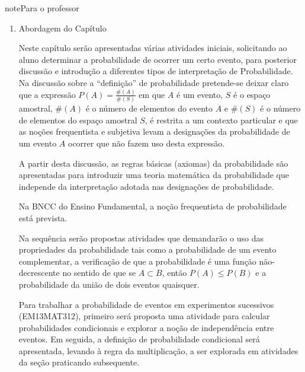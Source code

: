 \begin{sphinxadmonition}{note}{Para o professor}
\begin{enumerate}
(EM13MAT106) Identificar situações da vida cotidiana nas quais seja necessário fazer escolhas levando-se em conta os riscos probabilísticos (usar este ou aquele método contraceptivo, optar por um tratamento médico em detrimento de outro etc.)

(EM13MAT203) Aplicar conceitos matemáticos no planejamento, na execução e na análise de ações envolvendo a utilização de aplicativos e a criação de planilhas (para o controle de orçamento familiar, simuladores de cálculos de juros simples e compostos, entre outros), para tomar decisões.

\item {} 
Abordagem do Capítulo

Neste capítulo serão apresentadas várias atividades iniciais, solicitando ao aluno determinar a probabilidade de ocorrer um certo evento, para posterior discussão e introdução a diferentes tipos de interpretação de Probabilidade. Na discussão sobre a “definição” de probabilidade pretende-se deixar claro que a expressão \(P(A)=\displaystyle{\frac{\#(A)}{\#(S)}}\)  em que \(A\) é um evento, \(S\) é o espaço amostral, \(\#(A)\) é o número de elementos do evento \(A\) e \(\#(S)\) é o número de elementos do espaço amostral \(S\), é restrita a um contexto particular e que as noções frequentista e subjetiva levam a designações da probabilidade de um evento \(A\) ocorrer que não fazem uso desta expressão.

A partir desta discussão, as regras básicas (axiomas) da probabilidade são apresentadas para introduzir uma teoria matemática da probabilidade que independe da interpretação adotada nas designações de probabilidade.

Na BNCC do Ensino Fundamental, a noção frequentista de probabilidade está prevista.

Na sequência serão propostas atividades que demandarão o uso das propriedades da probabilidade tais como a probabilidade de um evento complementar, a verificação de que a probabilidade é uma função não-decrescente no sentido de que se \(A \subset B\), então \(P(A)\leq P(B)\) e a probabilidade da união de dois eventos quaisquer.

Para trabalhar a probabilidade de eventos em experimentos sucessivos (EM13MAT312), primeiro será proposta uma atividade para calcular probabilidades condicionais e explorar a noção de independência entre eventos. Em seguida, a definição de probabilidade condicional será apresentada, levando à regra da multiplicação, a ser explorada em atividades da seção praticando subsequente.


\end{enumerate}
\end{sphinxadmonition}
